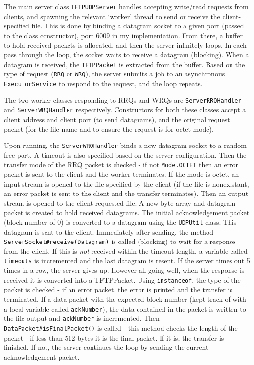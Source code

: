 \documentclass[a4paper]{article}
\newcommand{\code}{\texttt}
\begin{document}
The main server class \code{TFTPUDPServer} handles accepting write/read requests from clients, and spawning the relevant `worker' thread to send or receive the client-specified file. This is done by binding a datagram socket to a given port (passed to the class constructor), port 6009 in my implementation. From there, a buffer to hold received packets is allocated, and then the server infinitely loops. In each pass through the loop, the socket waits to receive a datagram (blocking). When a datagram is received, the \code{TFTPPacket} is extracted from the buffer. Based on the type of request (\code{RRQ} or \code{WRQ}), the server submits a job to an asynchronous \code{ExecutorService} to respond to the request, and the loop repeats.

The two worker classes responding to RRQs and WRQs are \code{ServerRRQHandler} and \code{ServerWRQHandler} respectively. Constructors for both these classes accept a client address and client port (to send datagrams), and the original request packet (for the file name and to ensure the request is for octet mode).

Upon running, the \code{ServerWRQHandler} binds a new datagram socket to a random free port.  A timeout is also specified based on the server configuration. Then the transfer mode of the RRQ packet is checked - if not \code{Mode.OCTET} then an error packet is sent to the client and the worker terminates. If the mode is octet, an input stream is opened to the file specified by the client (if the file is nonexistant, an error packet is sent to the client and the transfer terminates). Then an output stream is opened to the client-requested file. A new byte array and datagram packet is created to hold received datagrams. The initial acknowledgement packet (block number of 0) is converted to a datagram using the \code{UDPUtil} class. This datagram is sent to the client. Immediately after sending, the method \code{ServerSocket\#receive(Datagram)} is called (blocking) to wait for a response from the client. If this is \textit{not} received within the timeout length, a variable called \code{timeouts} is incremented and the last datagram is resent. If the server times out 5 times in a row, the server gives up. However all going well, when the response is received it is converted into a TFTPPacket. Using \code{instanceof}, the type of the packet is checked - if an error packet, the error is printed and the transfer is terminated. If a data packet with the expected block number (kept track of with a local variable called \code{ackNumber}), the data contained in the packet is written to the file output and \code{ackNumber} is incremented. Then \code{DataPacket\#isFinalPacket()} is called - this method checks the length of the packet - if less than 512 bytes it is the final packet. If it is, the transfer is finished. If not, the server continues the loop by sending the current acknowledgement packet.
\end{document}
